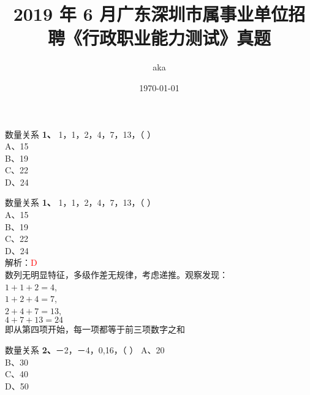 \documentclass[aspectratio=169]{beamer}
\begin{document}
%
%

\title{2019 年 6 月广东深圳市属事业单位招聘《行政职业能力测试》真题}
\author{aka}
\date{\today}

\begin{frame}
\titlepage
\end{frame}


\begin{frame}[t]{数量关系}
    \textbf{1、}
    1，1，2，4，7，13，（ ）\\
    A、15\\
    B、19\\
    C、22\\
    D、24\\
\end{frame}

\begin{frame}[t]{数量关系}
    \textbf{1、}
    1，1，2，4，7，13，（ ）\\
    A、15\\
    B、19\\
    C、22\\
    D、24\\
    解析：\textcolor{red}{D}\\
    数列无明显特征，多级作差无规律，考虑递推。观察发现：\\
    $1+1+2=4$,\\
    $1+2+4=7$,\\
    $2+4+7=13$,\\
    $4+7+13=24$\\
    即从第四项开始，每一项都等于前三项数字之和\\
\end{frame}


\begin{frame}[t]{数量关系}
    \textbf{2、}－2，－4，0,16，（ ）
    A、20\\
    B、30\\
    C、40\\
    D、50\\
\end{frame}
\end{document}
